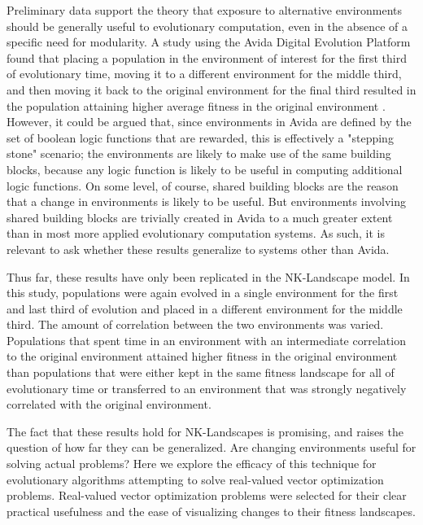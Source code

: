 \documentclass{sig-alternate}
\begin{document}
Preliminary data support the theory that exposure to alternative environments should be generally useful to evolutionary computation, even in the absence of a specific need for modularity. A study using the Avida Digital Evolution Platform found that placing a population in the environment of interest for the first third of evolutionary time, moving it to a different environment for the middle third, and then moving it back to the original environment for the final third resulted in the population attaining higher average fitness in the original environment \cite{nahum_improved_????}. However, it could be argued that, since environments in Avida are defined by the set of boolean logic functions that are rewarded, this is effectively a "stepping stone" scenario; the environments are likely to make use of the same building blocks, because any logic function is likely to be useful in computing additional logic functions. On some level, of course, shared building blocks are the reason that a change in environments is likely to be useful. But environments involving shared building blocks are trivially created in Avida to a much greater extent than in most more applied evolutionary computation systems. As such, it is relevant to ask whether these results generalize to systems other than Avida.

Thus far, these results have only been replicated in the NK-Landscape model. In this study, populations were again evolved in a single environment for the first and last third of evolution and placed in a different environment for the middle third. The amount of correlation between the two environments was varied. Populations that spent time in an environment with an intermediate correlation to the original environment attained higher fitness in the original environment than populations that were either kept in the same fitness landscape for all of evolutionary time or transferred to an environment that was strongly negatively correlated with the original environment\cite{nahum_unpublished_????}.

The fact that these results hold for NK-Landscapes is promising, and raises the question of how far they can be generalized. Are changing environments useful for solving actual problems? Here we explore the efficacy of this technique for evolutionary algorithms attempting to solve real-valued vector optimization problems. Real-valued vector optimization problems were selected for their clear practical usefulness and the ease of visualizing changes to their fitness landscapes.
\end{document}
